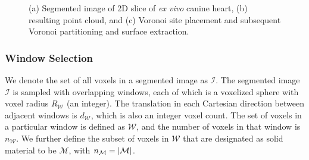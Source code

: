 \begin{figure}
%
\caption{(a) Segmented image of 2D slice of \textit{ex vivo} canine heart, (b) resulting point cloud, and (c) Voronoi site placement and subsequent Voronoi partitioning and surface extraction.}
\label{fig:d2dvor}
\end{figure}

\subsubsection{Window Selection}

We denote the set of all voxels in a segmented image as $\mathcal{I}$. The segmented image  $\mathcal{I}$ is sampled with overlapping windows, each of which is a voxelized sphere with voxel radius $R_{\mathcal{W}}$ (an integer). The translation in each Cartesian direction  between adjacent windows is $d_{\mathcal{W}}$, which is also an integer voxel count. The set of voxels in a particular window is defined as $\mathcal{W}$, and the number of voxels in that window is $n_{\mathcal{W}}$. We further define the subset of voxels in $\mathcal{W}$ that are designated as solid material to be $\mathcal{M}$, with $n_{\mathcal{M}} = | \mathcal{M} |$. 

